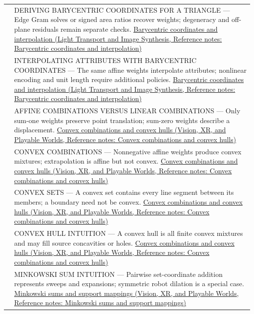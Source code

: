 {\begin{longtable}[]{@{}
  >{\raggedright\arraybackslash}p{}
  >{\raggedright\arraybackslash}p{}@{}}
569 & DERIVING BARYCENTRIC COORDINATES FOR A TRIANGLE --- Edge Gram solves or signed area ratios recover weights; degeneracy and off-plane residuals remain separate checks. \href{../04-Light-Transport-and-Image-Synthesis/main.pdf\#nameddest=appendix-02b9d9a81dca}{Barycentric coordinates and interpolation (Light Transport and Image Synthesis, Reference notes: Barycentric coordinates and interpolation)} \\
570 & INTERPOLATING ATTRIBUTES WITH BARYCENTRIC COORDINATES --- The same affine weights interpolate attributes; nonlinear encoding and unit length require additional policies. \href{../04-Light-Transport-and-Image-Synthesis/main.pdf\#nameddest=appendix-02b9d9a81dca}{Barycentric coordinates and interpolation (Light Transport and Image Synthesis, Reference notes: Barycentric coordinates and interpolation)} \\
571 & AFFINE COMBINATIONS VERSUS LINEAR COMBINATIONS --- Only sum-one weights preserve point translation; sum-zero weights describe a displacement. \href{../07-Vision-XR-and-Playable-Worlds/main.pdf\#nameddest=appendix-0026ec42c9d5}{Convex combinations and convex hulls (Vision, XR, and Playable Worlds, Reference notes: Convex combinations and convex hulls)} \\
572 & CONVEX COMBINATIONS --- Nonnegative affine weights produce convex mixtures; extrapolation is affine but not convex. \href{../07-Vision-XR-and-Playable-Worlds/main.pdf\#nameddest=appendix-0026ec42c9d5}{Convex combinations and convex hulls (Vision, XR, and Playable Worlds, Reference notes: Convex combinations and convex hulls)} \\
573 & CONVEX SETS --- A convex set contains every line segment between its members; a boundary need not be convex. \href{../07-Vision-XR-and-Playable-Worlds/main.pdf\#nameddest=appendix-0026ec42c9d5}{Convex combinations and convex hulls (Vision, XR, and Playable Worlds, Reference notes: Convex combinations and convex hulls)} \\
574 & CONVEX HULL INTUITION --- A convex hull is all finite convex mixtures and may fill source concavities or holes. \href{../07-Vision-XR-and-Playable-Worlds/main.pdf\#nameddest=appendix-0026ec42c9d5}{Convex combinations and convex hulls (Vision, XR, and Playable Worlds, Reference notes: Convex combinations and convex hulls)} \\
575 & MINKOWSKI SUM INTUITION --- Pairwise set-coordinate addition represents sweeps and expansions; symmetric robot dilation is a special case. \href{../07-Vision-XR-and-Playable-Worlds/main.pdf\#nameddest=appendix-215ac7099a82}{Minkowski sums and support mappings (Vision, XR, and Playable Worlds, Reference notes: Minkowski sums and support mappings)} \\

\end{longtable}}
